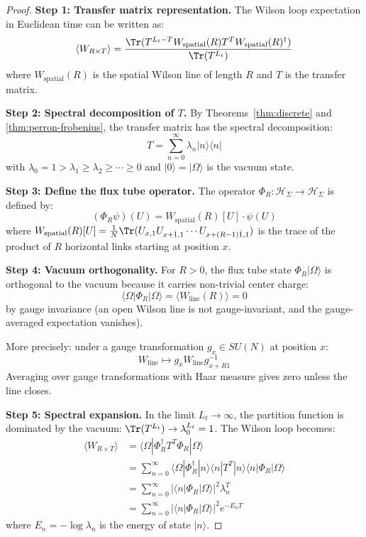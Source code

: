 \begin{proof}
\textbf{Step 1: Transfer matrix representation.}
The Wilson loop expectation in Euclidean time can be written as:
\[
\langle W_{R \times T} \rangle = \frac{\Tr(T^{L_t - T} W_{\text{spatial}}(R) T^T W_{\text{spatial}}(R)^\dagger)}{\Tr(T^{L_t})}
\]
where $W_{\text{spatial}}(R)$ is the spatial Wilson line of length $R$ and 
$T$ is the transfer matrix.

\textbf{Step 2: Spectral decomposition of $T$.}
By Theorems~\ref{thm:discrete} and \ref{thm:perron-frobenius}, the transfer 
matrix has the spectral decomposition:
\[
T = \sum_{n=0}^\infty \lambda_n |n\rangle\langle n|
\]
with $\lambda_0 = 1 > \lambda_1 \geq \lambda_2 \geq \cdots \geq 0$ and 
$|0\rangle = |\Omega\rangle$ is the vacuum state.

\textbf{Step 3: Define the flux tube operator.}
The operator $\Phi_R : \mathcal{H}_\Sigma \to \mathcal{H}_\Sigma$ is defined by:
\[
(\Phi_R \psi)(U) = W_{\text{spatial}}(R)[U] \cdot \psi(U)
\]
where $W_{\text{spatial}}(R)[U] = \frac{1}{N}\Tr(U_{x,1}U_{x+\hat{1},1}\cdots U_{x+(R-1)\hat{1},1})$ 
is the trace of the product of $R$ horizontal links starting at position $x$.

\textbf{Step 4: Vacuum orthogonality.}
For $R > 0$, the flux tube state $\Phi_R|\Omega\rangle$ is orthogonal to the 
vacuum because it carries non-trivial center charge:
\[
\langle \Omega | \Phi_R | \Omega \rangle = \langle W_{\text{line}}(R) \rangle = 0
\]
by gauge invariance (an open Wilson line is not gauge-invariant, and the 
gauge-averaged expectation vanishes).

More precisely: under a gauge transformation $g_x \in SU(N)$ at position $x$:
\[
W_{\text{line}} \mapsto g_x W_{\text{line}} g_{x+R\hat{1}}^{-1}
\]
Averaging over gauge transformations with Haar measure gives zero unless 
the line closes.

\textbf{Step 5: Spectral expansion.}
In the limit $L_t \to \infty$, the partition function is dominated by the 
vacuum: $\Tr(T^{L_t}) \to \lambda_0^{L_t} = 1$. The Wilson loop becomes:
\begin{align*}
\langle W_{R \times T} \rangle &= \langle \Omega | \Phi_R^\dagger T^T \Phi_R | \Omega \rangle \\
&= \sum_{n=0}^\infty \langle \Omega | \Phi_R^\dagger | n \rangle \langle n | T^T | n \rangle \langle n | \Phi_R | \Omega \rangle \\
&= \sum_{n=0}^\infty |\langle n | \Phi_R | \Omega \rangle|^2 \lambda_n^T \\
&= \sum_{n=0}^\infty |\langle n | \Phi_R | \Omega \rangle|^2 e^{-E_n T}
\end{align*}
where $E_n = -\log\lambda_n$ is the energy of state $|n\rangle$.
\end{proof}

